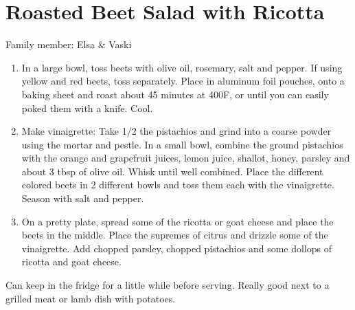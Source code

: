 \chapter{Roasted Beet Salad with Ricotta}
\label{ch:roasted-beet-salad}


Family member: Elsa \& Vaski

\begin{enumerate}
    \item  In a large bowl, toss beets with olive oil, rosemary, salt and pepper. If using yellow and red beets, toss separately. Place in aluminum foil pouches, onto a baking sheet and roast about 45 minutes at 400\degree F, or until you can easily poked them with a knife. Cool.
    \item Make vinaigrette: Take 1/2 the pistachios and grind into a coarse powder using the mortar and pestle. In a small bowl, combine the ground pistachios with the orange and grapefruit juices, lemon juice, shallot, honey, parsley and about 3 tbsp of olive oil. Whisk until well combined. Place the different colored beets in 2 different bowls and toss them each with the vinaigrette. Season with salt and pepper.
    \item On a pretty plate, spread some of the ricotta or goat cheese and place the beets in the middle. Place the supremes of citrus and drizzle some of the vinaigrette. Add chopped parsley, chopped pistachios and some dollops of ricotta and goat cheese.
\end{enumerate}

Can keep in the fridge for a little while before serving.
Really good next to a grilled meat or lamb dish with potatoes.

